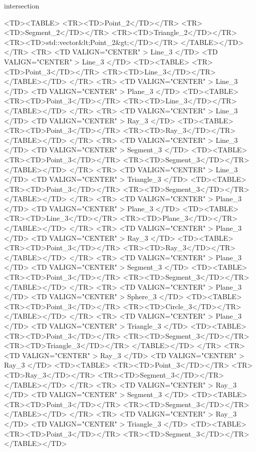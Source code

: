 \begin{ccRefFunction}{intersection}
\begin{ccHtmlOnly}
    <TD><TABLE>
	<TR><TD>Point_2</TD></TR>
	<TR><TD>Segment_2</TD></TR>
	<TR><TD>Triangle_2</TD></TR>
	<TR><TD>std::vector&lt;Point_2&gt;</TD></TR>
      </TABLE></TD>
</TR>
<TR>
    <TD VALIGN="CENTER" > Line_3 </TD>
    <TD VALIGN="CENTER" > Line_3 </TD>
    <TD><TABLE>
	<TR><TD>Point_3</TD></TR>
	<TR><TD>Line_3</TD></TR>
        </TABLE></TD>
</TR>
<TR>
    <TD VALIGN="CENTER" > Line_3 </TD>
    <TD VALIGN="CENTER" > Plane_3 </TD>
    <TD><TABLE>
	<TR><TD>Point_3</TD></TR>
	<TR><TD>Line_3</TD></TR>
        </TABLE></TD>
</TR>
<TR>
    <TD VALIGN="CENTER" > Line_3 </TD>
    <TD VALIGN="CENTER" > Ray_3 </TD>
    <TD><TABLE>
	<TR><TD>Point_3</TD></TR>
	<TR><TD>Ray_3</TD></TR>
        </TABLE></TD>
</TR>
<TR>
    <TD VALIGN="CENTER" > Line_3 </TD>
    <TD VALIGN="CENTER" > Segment_3 </TD>
    <TD><TABLE>
	<TR><TD>Point_3</TD></TR>
	<TR><TD>Segment_3</TD></TR>
        </TABLE></TD>
</TR>
<TR>
    <TD VALIGN="CENTER" > Line_3 </TD>
    <TD VALIGN="CENTER" > Triangle_3 </TD>
    <TD><TABLE>
	<TR><TD>Point_3</TD></TR>
	<TR><TD>Segment_3</TD></TR>
        </TABLE></TD>
</TR>
<TR>
    <TD VALIGN="CENTER" > Plane_3 </TD>
    <TD VALIGN="CENTER" > Plane_3 </TD>
    <TD><TABLE>
	<TR><TD>Line_3</TD></TR>
	<TR><TD>Plane_3</TD></TR>
        </TABLE></TD>
</TR>
<TR>
    <TD VALIGN="CENTER" > Plane_3 </TD>
    <TD VALIGN="CENTER" > Ray_3 </TD>
    <TD><TABLE>
	<TR><TD>Point_3</TD></TR>
	<TR><TD>Ray_3</TD></TR>
        </TABLE></TD>
</TR>
<TR>
    <TD VALIGN="CENTER" > Plane_3 </TD>
    <TD VALIGN="CENTER" > Segment_3 </TD>
    <TD><TABLE>
	<TR><TD>Point_3</TD></TR>
	<TR><TD>Segment_3</TD></TR>
        </TABLE></TD>
</TR>
<TR>
    <TD VALIGN="CENTER" > Plane_3 </TD>
    <TD VALIGN="CENTER" > Sphere_3 </TD>
    <TD><TABLE>
	<TR><TD>Point_3</TD></TR>
	<TR><TD>Circle_3</TD></TR>
        </TABLE></TD>
</TR>
<TR>
    <TD VALIGN="CENTER" > Plane_3 </TD>
    <TD VALIGN="CENTER" > Triangle_3 </TD>
    <TD><TABLE>
	<TR><TD>Point_3</TD></TR>
	<TR><TD>Segment_3</TD></TR>
	<TR><TD>Triangle_3</TD></TR>
        </TABLE></TD>
</TR>
<TR>
    <TD VALIGN="CENTER" > Ray_3 </TD>
    <TD VALIGN="CENTER" > Ray_3 </TD>
    <TD><TABLE>
	<TR><TD>Point_3</TD></TR>
	<TR><TD>Ray_3</TD></TR>
        <TR><TD>Segment_3</TD></TR>
        </TABLE></TD>
</TR>
<TR>
    <TD VALIGN="CENTER" > Ray_3 </TD>
    <TD VALIGN="CENTER" > Segment_3 </TD>
    <TD><TABLE>
	<TR><TD>Point_3</TD></TR>
	<TR><TD>Segment_3</TD></TR>
        </TABLE></TD>
</TR>
<TR>
    <TD VALIGN="CENTER" > Ray_3 </TD>
    <TD VALIGN="CENTER" > Triangle_3 </TD>
    <TD><TABLE>
	<TR><TD>Point_3</TD></TR>
	<TR><TD>Segment_3</TD></TR>
        </TABLE></TD>

\end{ccHtmlOnly}
\end{ccRefFunction}
